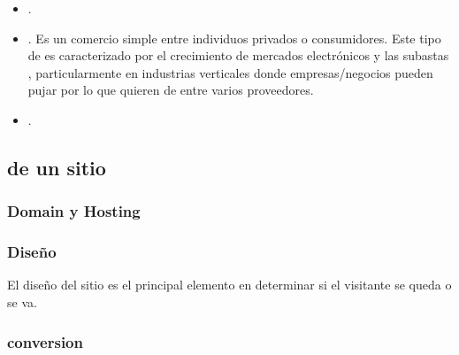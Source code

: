 \begin{itemize}
	\item \textbf{\gtog}.

	\item \textbf{\ctoc}. Es un comercio simple entre individuos privados o consumidores. Este tipo de \ecommerce es caracterizado por el crecimiento de mercados electrónicos y las subastas \online, particularmente en industrias verticales donde empresas/negocios pueden pujar por lo que quieren de entre varios proveedores.

	\item \textbf{\mcommerce}.
	
\end{itemize}

\subsection{\keyelements de un sitio \ecommerce \cite{inbook_ecommerce_keyelements}}

\subsubsection{Domain y Hosting}

\subsubsection{Diseño}
El diseño del sitio es el principal elemento en determinar si el visitante se queda o se va.

\subsubsection{\usabilityQA}

\subsubsection{conversion}

\subsubsection{\checkoutCOM}

